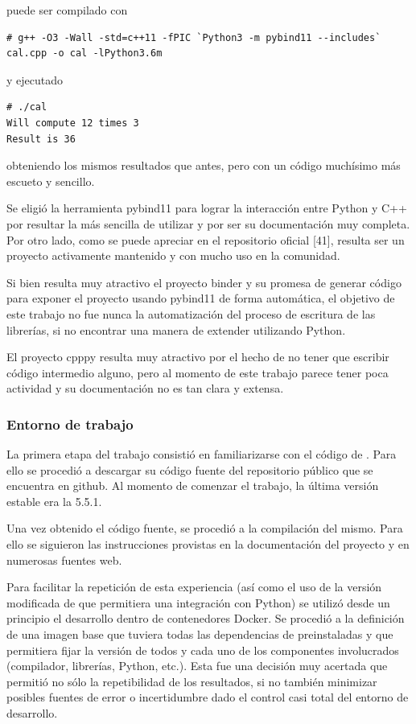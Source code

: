 \documentclass[]{article}
\begin{document}
\inputminted{c}{codelistings/use_multiply_pybind.c}

puede ser compilado con

\begin{verbatim}
# g++ -O3 -Wall -std=c++11 -fPIC `Python3 -m pybind11 --includes` cal.cpp -o cal -lPython3.6m
\end{verbatim}

y ejecutado

\begin{verbatim}
# ./cal
Will compute 12 times 3
Result is 36
\end{verbatim}

obteniendo los mismos resultados que antes, pero con un código muchísimo más
escueto y sencillo.

Se eligió la herramienta pybind11 para lograr la interacción entre Python y C++
por resultar la más sencilla de utilizar y por ser su documentación muy
completa. Por otro lado, como se puede apreciar en el repositorio oficial [41],
resulta ser un proyecto activamente mantenido y con mucho uso en la comunidad.

Si bien resulta muy atractivo el proyecto binder y su promesa de generar
código para exponer el proyecto usando pybind11 de forma automática, el
objetivo de este trabajo no fue nunca la automatización del proceso de
escritura de las librerías, si no encontrar una manera de extender \omnetpp{}
utilizando Python.

El proyecto cpppy resulta muy atractivo por el hecho de no tener que escribir
código intermedio alguno, pero al momento de este trabajo parece tener poca
actividad y su documentación no es tan clara y extensa.

\subsubsection{Entorno de trabajo}

La primera etapa del trabajo consistió en familiarizarse con el código de
\omnetpp{}. Para ello se procedió a descargar su código fuente del repositorio
público que se encuentra en github. Al momento de comenzar el trabajo, la
última versión estable era la 5.5.1.

Una vez obtenido el código fuente, se procedió a la compilación del mismo. Para
ello se siguieron las instrucciones provistas en la documentación del proyecto
y en numerosas fuentes web.

Para facilitar la repetición de esta experiencia (así como el uso de la versión
modificada de \omnetpp{} que permitiera una integración con Python) se utilizó
desde un principio el desarrollo dentro de contenedores Docker. Se procedió a
la definición de una imagen base que tuviera todas las dependencias de \omnetpp{}
preinstaladas y que permitiera fijar la versión de todos y cada uno de los
componentes involucrados (compilador, librerías, Python, etc.). Esta fue una
decisión muy acertada que permitió no sólo la repetibilidad de los resultados,
si no también minimizar posibles fuentes de error o incertidumbre dado el
control casi total del entorno de desarrollo.
\end{document}

